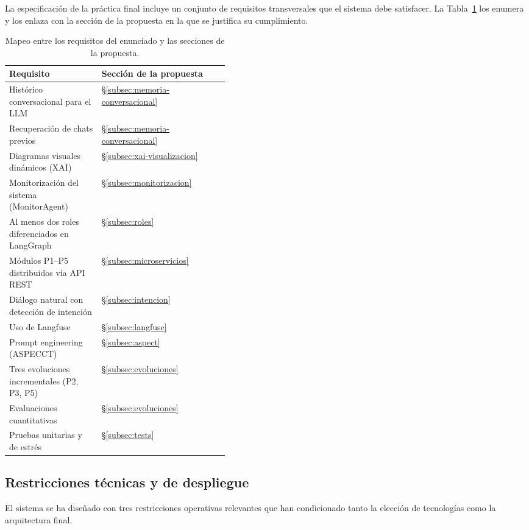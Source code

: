 La especificación de la práctica final incluye un conjunto de
requisitos transversales que el sistema debe satisfacer. La
Tabla~\ref{tab:requisitos} los enumera y los enlaza con la sección de
la propuesta en la que se justifica su cumplimiento.

\begin{table}[!htbp]
  \centering
  \footnotesize
  \begin{tabularx}{\linewidth}{@{}p{0.42\linewidth} X@{}}
    \toprule
    \textbf{Requisito} & \textbf{Sección de la propuesta} \\
    \midrule
    Histórico conversacional para el LLM &
      \S\ref{subsec:memoria-conversacional} \\
    Recuperación de chats previos &
      \S\ref{subsec:memoria-conversacional} \\
    Diagramas visuales dinámicos (XAI) &
      \S\ref{subsec:xai-visualizacion} \\
    Monitorización del sistema (MonitorAgent) &
      \S\ref{subsec:monitorizacion} \\
    Al menos dos roles diferenciados en LangGraph &
      \S\ref{subsec:roles} \\
    Módulos P1--P5 distribuidos vía API REST &
      \S\ref{subsec:microservicios} \\
    Diálogo natural con detección de intención &
      \S\ref{subsec:intencion} \\
    Uso de Langfuse &
      \S\ref{subsec:langfuse} \\
    Prompt engineering (ASPECCT) &
      \S\ref{subsec:aspect} \\
    Tres evoluciones incrementales (P2, P3, P5) &
      \S\ref{subsec:evoluciones} \\
    Evaluaciones cuantitativas &
      \S\ref{subsec:evoluciones} \\
    Pruebas unitarias y de estrés &
      \S\ref{subsec:tests} \\
    \bottomrule
  \end{tabularx}
  \caption{Mapeo entre los requisitos del enunciado y las secciones de la
  propuesta.}
  \label{tab:requisitos}
\end{table}

\subsection{Restricciones técnicas y de despliegue}

El sistema se ha diseñado con tres restricciones operativas
relevantes que han condicionado tanto la elección de tecnologías
como la arquitectura final.

